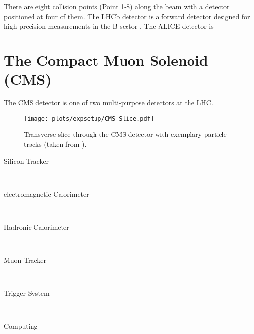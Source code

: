 There are eight collision points (Point 1-8) along the beam with a detector positioned at four of them. The LHCb detector is a forward detector designed for high precision measurements in the B-sector \cite{LHCB}. The ALICE detector is 

\section{The Compact Muon Solenoid (CMS)}
The CMS detector is one of two multi-purpose detectors at the LHC. 
\begin{figure}
	\centering
	\texttt{[image: plots/expsetup/CMS\_Slice.pdf]}
	\caption[Transverse slice through the CMS detector]{Transverse slice through the CMS detector with exemplary particle tracks (taken from \cite{cms_slice}).}
	\label{fig:expsetup:cms_slice}
\end{figure}
\begin{description}
\item[Silicon Tracker] \hfill \\
\item[electromagnetic Calorimeter] \hfill \\
\item[Hadronic Calorimeter] \hfill \\
\item[Muon Tracker] \hfill \\
\item[Trigger System] \hfill \\
\item[Computing] \hfill \\
\end{description}